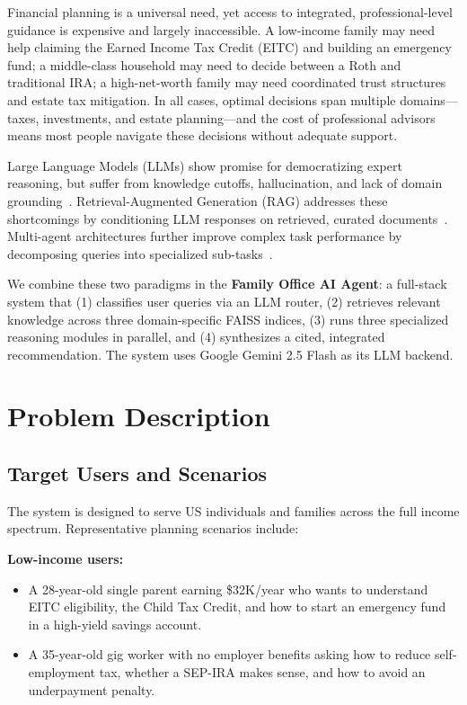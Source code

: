 \documentclass[sigplan,screen]{acmart}
\begin{document}
Financial planning is a universal need, yet access to integrated, professional-level guidance is expensive and largely inaccessible.
A low-income family may need help claiming the Earned Income Tax Credit (EITC) and building an emergency fund; a middle-class household may need to decide between a Roth and traditional IRA; a high-net-worth family may need coordinated trust structures and estate tax mitigation.
In all cases, optimal decisions span multiple domains---taxes, investments, and estate planning---and the cost of professional advisors means most people navigate these decisions without adequate support.

Large Language Models (LLMs) show promise for democratizing expert reasoning, but suffer from knowledge cutoffs, hallucination, and lack of domain grounding~\cite{Lewis2020}.
Retrieval-Augmented Generation (RAG) addresses these shortcomings by conditioning LLM responses on retrieved, curated documents~\cite{Lewis2020}.
Multi-agent architectures further improve complex task performance by decomposing queries into specialized sub-tasks~\cite{Wang2024}.

We combine these two paradigms in the \textbf{Family Office AI Agent}: a full-stack system that (1) classifies user queries via an LLM router, (2) retrieves relevant knowledge across three domain-specific FAISS indices, (3) runs three specialized reasoning modules in parallel, and (4) synthesizes a cited, integrated recommendation.
The system uses Google Gemini 2.5 Flash as its LLM backend.

\section{Problem Description}

\subsection{Target Users and Scenarios}

The system is designed to serve US individuals and families across the full income spectrum.
Representative planning scenarios include:

\textbf{Low-income users:}
\begin{itemize}
  \item A 28-year-old single parent earning \$32K/year who wants to understand EITC eligibility, the Child Tax Credit, and how to start an emergency fund in a high-yield savings account.
  \item A 35-year-old gig worker with no employer benefits asking how to reduce self-employment tax, whether a SEP-IRA makes sense, and how to avoid an underpayment penalty.
\end{itemize}
\end{document}
